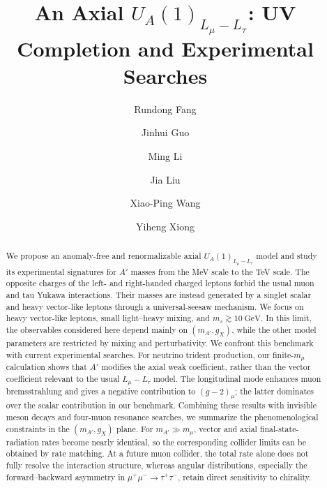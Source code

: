 \documentclass[onecolumn, aps, nofootinbib, prd, preprint, floats, floatfix, amsmath, amssymb, superscriptaddress, preprintnumbers]{revtex4-2}
\begin{document}
\title{An Axial $U_A(1)_{L_\mu-L_\tau}$: UV Completion and Experimental Searches}

\author{Rundong Fang}

\author{Jinhui Guo}

\author{Ming Li }

\author{Jia Liu }

\author{Xiao-Ping Wang  }

\author{Yiheng Xiong  }

\begin{abstract}
We propose an anomaly-free and renormalizable axial $U_A(1)_{L_\mu-L_\tau}$ model and study its experimental signatures for $A'$ masses from the MeV scale to the TeV scale. The opposite charges of the left- and right-handed charged leptons forbid the usual muon and tau Yukawa interactions. Their masses are instead generated by a singlet scalar and heavy vector-like leptons through a universal-seesaw mechanism. We focus on heavy vector-like leptons, small light--heavy mixing, and $m_s\gtrsim10~\mathrm{GeV}$. In this limit, the observables considered here depend mainly on $(m_{A'},g_X)$, while the other model parameters are restricted by mixing and perturbativity. We confront this benchmark with current experimental searches. For neutrino trident production, our finite-$m_\mu$ calculation shows that $A'$ modifies the axial weak coefficient, rather than the vector coefficient relevant to the usual $L_\mu-L_\tau$ model. The longitudinal mode enhances muon bremsstrahlung and gives a negative contribution to $(g-2)_\mu$; the latter dominates over the scalar contribution in our benchmark. Combining these results with invisible meson decays and four-muon resonance searches, we summarize the phenomenological constraints in the $(m_{A'},g_X)$ plane. For $m_{A'}\gg m_\mu$, vector and axial final-state-radiation rates become nearly identical, so the corresponding collider limits can be obtained by rate matching. At a future muon collider, the total rate alone does not fully resolve the interaction structure, whereas angular distributions, especially the forward--backward asymmetry in $\mu^+\mu^-\to\tau^+\tau^-$, retain direct sensitivity to chirality.
\end{abstract}
\end{document}
